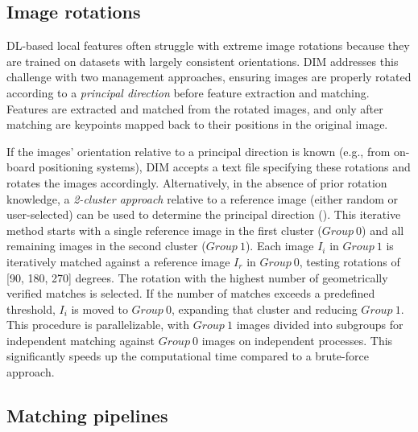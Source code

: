 \subsection{Image rotations}

DL-based local features often struggle with extreme image rotations because they are trained on datasets with largely consistent orientations. 
DIM addresses this challenge with two management approaches, ensuring images are properly rotated according to a \textit{principal direction} before feature extraction and matching.
Features are extracted and matched from the rotated images, and only after matching are keypoints mapped back to their positions in the original image.

If the images' orientation relative to a principal direction is known (e.g., from on-board positioning systems), DIM accepts a text file specifying these rotations and rotates the images accordingly.
Alternatively, in the absence of prior rotation knowledge, a \textit{2-cluster approach} relative to a reference image (either random or user-selected) can be used to determine the principal direction ().
This iterative method starts with a single reference image in the first cluster ($Group~0$) and all remaining images in the second cluster ($Group~1$). 
Each image $I_i$ in $Group~1$ is iteratively matched against a reference image $I_r$ in $Group~0$, testing rotations of [90, 180, 270] degrees. 
The rotation with the highest number of geometrically verified matches is selected. 
If the number of matches exceeds a predefined threshold, $I_i$ is moved to $Group~0$, expanding that cluster and reducing $Group~1$. 
This procedure is parallelizable, with $Group~1$ images divided into subgroups for independent matching against $Group~0$ images on independent processes.
This significantly speeds up the computational time compared to a brute-force approach. 

\subsection{Matching pipelines}

